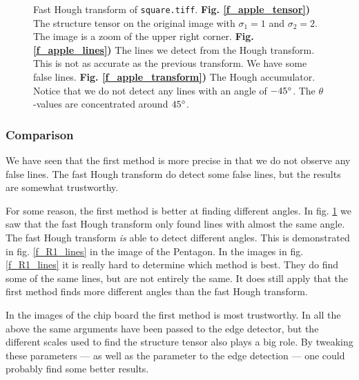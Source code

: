 \documentclass[a4paper, 10pt, final]{article}
\begin{document}
\begin{figure}[!h]
    \caption[]{
    Fast Hough transform of \texttt{square.tiff}.
    \textbf{Fig. \ref{f_apple_tensor})} The structure tensor on the
    original image with $\sigma_1 = 1$ and $\sigma_2 =
    2$. The image is a zoom of the upper right corner.
    \textbf{Fig. \ref{f_apple_lines})} The lines we detect from the
    Hough transform. This is not as accurate as the previous transform.
    We have some false lines.
    \textbf{Fig. \ref{f_apple_transform})} The Hough accumulator. Notice
    that we do not detect any lines with an angle of $-45^\circ$. The
    $\theta$-values are concentrated around $45^\circ$.
    }
    \label{f_apple_hough_transform}
\end{figure}

\subsubsection*{Comparison}
We have seen that the first method is more precise in that we do not
observe any false lines. The fast Hough transform do detect some false
lines, but the results are somewhat trustworthy.

For some reason, the first method is better at finding different angles.
In fig. \ref{f_apple_hough_transform} we saw that the fast Hough
transform only found lines with almost the same angle. The fast Hough
transform \emph{is} able to detect different angles. This is
demonstrated in fig. \ref{f_R1_lines} in the image of the Pentagon. In
the images in fig. \ref{f_R1_lines} it is really hard to determine which
method is best. They do find some of the same lines, but are not
entirely the same. It does still apply that the first method finds more
different angles than the fast Hough transform.

In the images of the chip board the first method is most trustworthy.
In all the above the same arguments have been passed to the edge
detector, but the different scales used to find the structure tensor
also plays a big role. By tweaking these parameters --- as well as the
parameter to the edge detection --- one could probably find some better
results.
\end{document}
